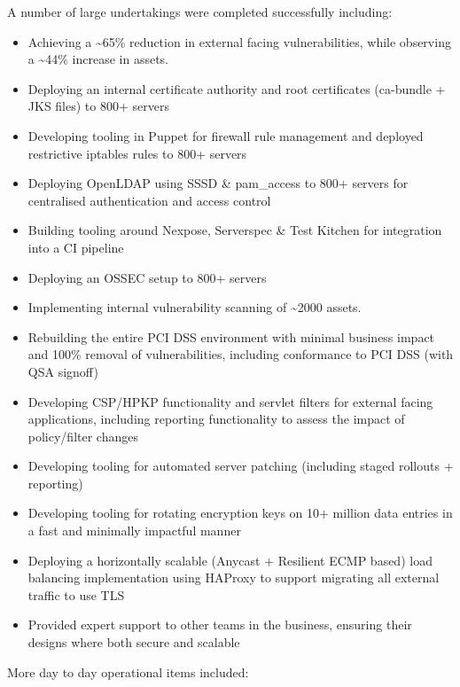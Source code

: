 A number of large undertakings were completed successfully including:

\begin{itemize}
\tightlist
\item
  Achieving a \textasciitilde{}65\% reduction in external facing
  vulnerabilities, while observing a \textasciitilde{}44\% increase in
  assets.
\item
  Deploying an internal certificate authority and root certificates
  (ca-bundle + JKS files) to 800+ servers
\item
  Developing tooling in Puppet for firewall rule management and deployed
  restrictive iptables rules to 800+ servers
\item
  Deploying OpenLDAP using SSSD \& pam\_access to 800+ servers for
  centralised authentication and access control
\item
  Building tooling around Nexpose, Serverspec \& Test Kitchen for
  integration into a CI pipeline
\item
  Deploying an OSSEC setup to 800+ servers
\item
  Implementing internal vulnerability scanning of \textasciitilde{}2000
  assets.
\item
  Rebuilding the entire PCI DSS environment with minimal business impact
  and 100\% removal of vulnerabilities, including conformance to PCI DSS
  (with QSA signoff)
\item
  Developing CSP/HPKP functionality and servlet filters for external
  facing applications, including reporting functionality to assess the
  impact of policy/filter changes
\item
  Developing tooling for automated server patching (including staged
  rollouts + reporting)
\item
  Developing tooling for rotating encryption keys on 10+ million data
  entries in a fast and minimally impactful manner
\item
  Deploying a horizontally scalable (Anycast + Resilient ECMP based)
  load balancing implementation using HAProxy to support migrating all
  external traffic to use TLS
\item
  Provided expert support to other teams in the business, ensuring their
  designs where both secure and scalable
\end{itemize}

More day to day operational items included:

